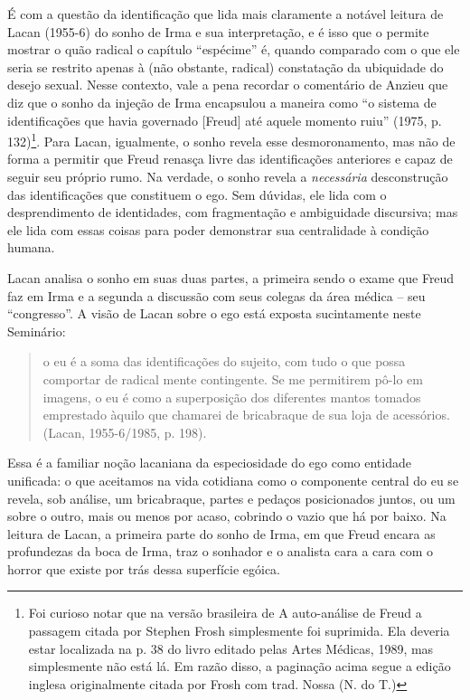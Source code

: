 É com a questão da identificação que lida mais claramente a notável
leitura de Lacan (1955-6) do sonho de Irma e sua interpretação, e é isso
que o permite mostrar o quão radical o capítulo ``espécime'' é, quando
comparado com o que ele seria se restrito apenas à (não obstante,
radical) constatação da ubiquidade do desejo sexual. Nesse contexto,
vale a pena recordar o comentário de Anzieu que diz que o sonho da
injeção de Irma encapsulou a maneira como ``o sistema de identificações
que havia governado {[}Freud{]} até aquele momento ruiu'' (1975, p.
132)\footnote{Foi curioso notar que na versão brasileira de A
  auto-análise de Freud a passagem citada por Stephen Frosh simplesmente
  foi suprimida. Ela deveria estar localizada na p. 38 do livro editado
  pelas Artes Médicas, 1989, mas simplesmente não está lá. Em razão
  disso, a paginação acima segue a edição inglesa originalmente citada
  por Frosh com trad. Nossa (N. do T.)}. Para Lacan, igualmente, o sonho
revela esse desmoronamento, mas não de forma a permitir que Freud
renasça livre das identificações anteriores e capaz de seguir seu
próprio rumo. Na verdade, o sonho revela a \emph{necessária}
desconstrução das identificações que constituem o ego. Sem dúvidas, ele
lida com o desprendimento de identidades, com fragmentação e ambiguidade
discursiva; mas ele lida com essas coisas para poder demonstrar sua
centralidade à condição humana.

Lacan analisa o sonho em suas duas partes, a primeira sendo o exame que
Freud faz em Irma e a segunda a discussão com seus colegas da área
médica -- seu ``congresso''. A visão de Lacan sobre o ego está exposta
sucintamente neste Seminário:

\begin{quote}
o eu é a soma das identificações do sujeito, com tudo o que possa
comportar de radical mente contingente. Se me permitirem pô-lo em
imagens, o eu é como a superposição dos diferentes mantos tomados
emprestado àquilo que chamarei de bricabraque de sua loja de acessórios.
(Lacan, 1955-6/1985, p. 198).
\end{quote}

Essa é a familiar noção lacaniana da especiosidade do ego como entidade
unificada: o que aceitamos na vida cotidiana como o componente central
do eu se revela, sob análise, um bricabraque, partes e pedaços
posicionados juntos, ou um sobre o outro, mais ou menos por acaso,
cobrindo o vazio que há por baixo. Na leitura de Lacan, a primeira parte
do sonho de Irma, em que Freud encara as profundezas da boca de Irma,
traz o sonhador e o analista cara a cara com o horror que existe por
trás dessa superfície egóica.

